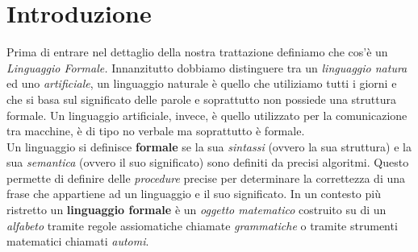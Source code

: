 \section*{Introduzione}
Prima di entrare nel dettaglio della nostra trattazione definiamo che cos'è un \emph{Linguaggio Formale.} Innanzitutto dobbiamo distinguere tra un \emph{linguaggio natura} ed uno \emph{artificiale}, un linguaggio naturale è quello che utiliziamo tutti i giorni e che si basa sul significato delle parole e soprattutto non possiede una struttura formale. Un linguaggio artificiale, invece, è quello utilizzato per la comunicazione tra macchine, è di tipo no verbale ma soprattutto è formale.\\
Un linguaggio si definisce \textbf{formale} se la sua \emph{sintassi} (ovvero la sua struttura) e la sua \emph{semantica} (ovvero il suo significato) sono definiti da precisi algoritmi. Questo permette di definire delle \emph{procedure} precise per determinare la correttezza di una frase che appartiene ad un linguaggio e il suo significato. 
In un contesto più ristretto un \textbf{linguaggio formale} è un \emph{oggetto matematico} costruito su di un \emph{alfabeto} tramite regole assiomatiche chiamate \emph{grammatiche} o tramite strumenti matematici chiamati \emph{automi}.\\
